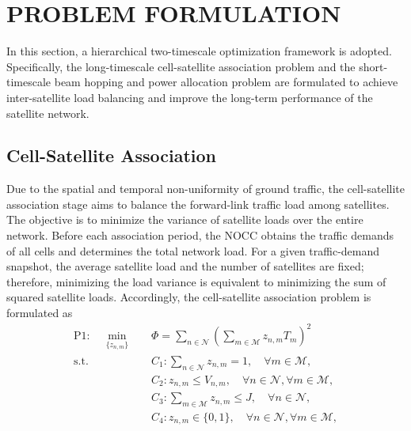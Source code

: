 \documentclass[journal]{IEEEtran}
\begin{document}
\section{PROBLEM FORMULATION}
\label{sec:problem-formulation}
In this section, a hierarchical two-timescale optimization framework is adopted. Specifically, the long-timescale cell-satellite association problem and the short-timescale beam hopping and power allocation problem are formulated to achieve inter-satellite load balancing and improve the long-term performance of the satellite network.

\subsection{Cell-Satellite Association}
\label{subsec:cell-satellite-association}
Due to the spatial and temporal non-uniformity of ground traffic, the cell-satellite association stage aims to balance the forward-link traffic load among satellites. The objective is to minimize the variance of satellite loads over the entire network. Before each association period, the NOCC obtains the traffic demands of all cells and determines the total network load. For a given traffic-demand snapshot, the average satellite load and the number of satellites are fixed; therefore, minimizing the load variance is equivalent to minimizing the sum of squared satellite loads. Accordingly, the cell-satellite association problem is formulated as 
\begin{equation}
\label{prob:p1}
\begin{aligned}
\mathrm{P1}:\quad
\min_{\{z_{n,m}\}} \quad
& \Phi =
\sum_{n\in\mathcal{N}}
\left(
\sum_{m\in\mathcal{M}} z_{n,m}T_m
\right)^2 \\
\mathrm{s.t.}\quad
& C_1:\sum_{n\in\mathcal{N}}z_{n,m}=1,\quad \forall m\in\mathcal{M},\\
& C_2:z_{n,m}\leq V_{n,m},\quad \forall n\in\mathcal{N},\forall m\in\mathcal{M},\\
& C_3:\sum_{m\in\mathcal{M}}z_{n,m}\leq J,\quad \forall n\in\mathcal{N},\\
& C_4:z_{n,m}\in\{0,1\},\quad \forall n\in\mathcal{N},\forall m\in\mathcal{M},
\end{aligned}
\end{equation}
\end{document}
